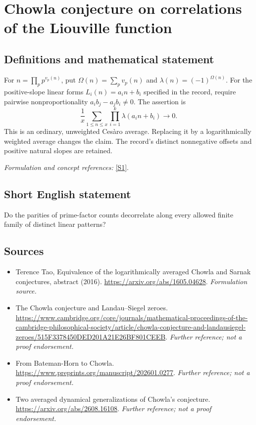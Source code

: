 \documentclass[11pt]{article}
\begin{document}
\section*{\texorpdfstring{Chowla conjecture on correlations of the Liouville function}{Chowla conjecture on correlations of the Liouville function}}\label{30006713}
\subsection{Definitions and mathematical statement}
For $n=\prod_p p^{v_p(n)}$, put $\Omega(n)=\sum_pv_p(n)$ and $\lambda(n)=(-1)^{\Omega(n)}$. For the positive-slope linear forms $L_i(n)=a_in+b_i$ specified in the record, require pairwise nonproportionality $a_ib_j-a_jb_i\ne0$. The assertion is
\[
 \frac1x\sum_{1\le n\le x}\prod_{i=1}^k\lambda(a_in+b_i)\longrightarrow0.
\]
This is an ordinary, unweighted Cesàro average. Replacing it by a logarithmically weighted average changes the claim. The record's distinct nonnegative offsets and positive natural slopes are retained.
\par\smallskip\textit{Formulation and concept references:} \href{https://arxiv.org/abs/1605.04628}{[S1]}.

\subsection{Short English statement}
Do the parities of prime-factor counts decorrelate along every allowed finite family of distinct linear patterns?
\subsection{Sources}
\begin{itemize}
\item[S1]Terence Tao, Equivalence of the logarithmically averaged Chowla and Sarnak conjectures, abstract (2016).
\url{https://arxiv.org/abs/1605.04628}.
\textit{Formulation source.}
\item[S2]The Chowla conjecture and Landau–Siegel zeroes.
\url{https://www.cambridge.org/core/journals/mathematical-proceedings-of-the-cambridge-philosophical-society/article/chowla-conjecture-and-landausiegel-zeroes/515F3378450DED201A21E26BF801CEEB}.
\textit{Further reference; not a proof endorsement.}
\item[S3]From Bateman-Horn to Chowla.
\url{https://www.preprints.org/manuscript/202601.0277}.
\textit{Further reference; not a proof endorsement.}
\item[S4]Two averaged dynamical generalizations of Chowla's conjecture.
\url{https://arxiv.org/abs/2608.16108}.
\textit{Further reference; not a proof endorsement.}
\end{itemize}
\end{document}
